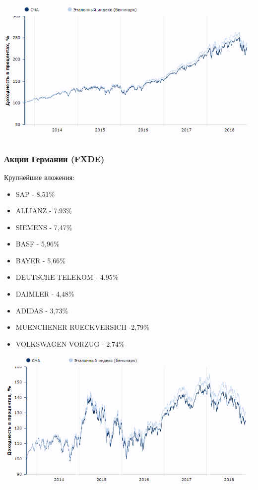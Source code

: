 \includegraphics[width=16cm]{pics/alina/usait.png}

\subsubsection{Акции Германии (FXDE)}

Крупнейшие вложения:

\begin{itemize}
	\item SAP - 8,51\%
	\item ALLIANZ - 7.93\%
	\item SIEMENS - 7,47\%
	\item BASF - 5,96\%
	\item BAYER - 5,66\%
	\item DEUTSCHE TELEKOM - 4,95\%
	\item DAIMLER - 4,48\%
	\item ADIDAS - 3,73\%
	\item MUENCHENER RUECKVERSICH -2,79\%
	\item VOLKSWAGEN VORZUG - 2,74\%
\end{itemize}

\includegraphics[width=16cm]{pics/alina/germany.png}

